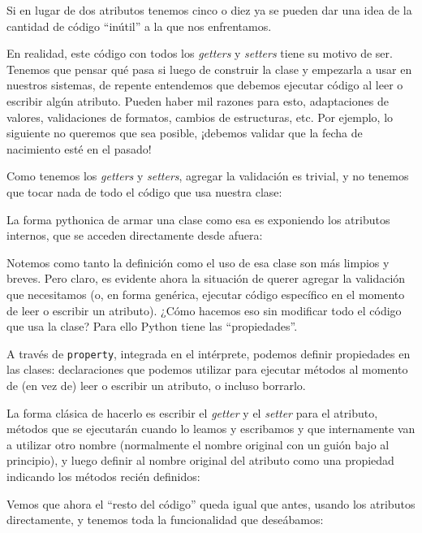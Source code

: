 Si en lugar de dos atributos tenemos cinco o diez ya se pueden dar una idea de la cantidad de código ``inútil'' a la que nos enfrentamos. 

En realidad, este código con todos los \textit{getters} y \textit{setters} tiene su motivo de ser. Tenemos que pensar qué pasa si luego de construir la clase y empezarla a usar en nuestros sistemas, de repente entendemos que debemos ejecutar código al leer o escribir algún atributo. Pueden haber mil razones para esto, adaptaciones de valores, validaciones de formatos, cambios de estructuras, etc. Por ejemplo, lo siguiente no queremos que sea posible, ¡debemos validar que la fecha de nacimiento esté en el pasado!


Como tenemos los \textit{getters} y \textit{setters}, agregar la validación es trivial, y no tenemos que tocar nada de todo el código que usa nuestra clase:


La forma pythonica de armar una clase como esa es exponiendo los atributos internos, que se acceden directamente desde afuera:


Notemos como tanto la definición como el uso de esa clase son más limpios y breves. Pero claro, es evidente ahora la situación de querer agregar la validación que necesitamos (o, en forma genérica, ejecutar código específico en el momento de leer o escribir un atributo). ¿Cómo hacemos eso sin modificar todo el código que usa la clase? Para ello Python tiene las ``propiedades''.

A través de \texttt{property}, integrada en el intérprete, podemos definir propiedades en las clases: declaraciones que podemos utilizar para ejecutar métodos al momento de (en vez de) leer o escribir un atributo, o incluso borrarlo.

La forma clásica de hacerlo es escribir el \textit{getter} y el \textit{setter} para el atributo, métodos que se ejecutarán cuando lo leamos y escribamos y que internamente van a utilizar otro nombre (normalmente el nombre original con un guión bajo al principio), y luego definir al nombre original del atributo como una propiedad indicando los métodos recién definidos:


Vemos que ahora el ``resto del código'' queda igual que antes, usando los atributos directamente, y tenemos toda la funcionalidad que deseábamos:

